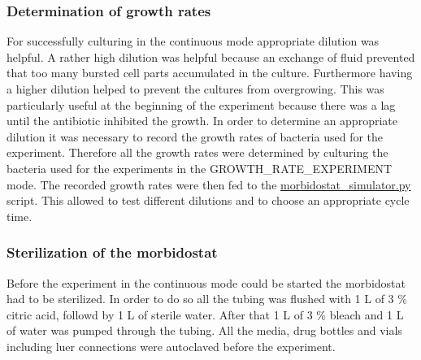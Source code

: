 \subsubsection{Determination of growth rates}
For successfully culturing in the continuous mode appropriate dilution was helpful. A rather high dilution was helpful because an exchange of fluid prevented that too many bursted cell parts accumulated in the culture. Furthermore having a higher dilution helped to prevent the cultures from overgrowing. This was particularly useful at the beginning of the experiment because there was a lag until the antibiotic inhibited the growth. In order to determine an appropriate dilution it was necessary to record the growth rates of bacteria used for the experiment. Therefore all the growth rates were determined by culturing the bacteria used for the experiments in  the GROWTH\_RATE\_EXPERIMENT mode. The recorded growth rates were then fed to the \href{https://github.com/nahanoo/ESBL\_project/}{morbidostat\_simulator.py} script. This allowed to test different dilutions and to choose an appropriate cycle time. 
\label{section:growth_rates} 

\subsubsection{Sterilization of the morbidostat}
Before the experiment in the continuous mode could be started the morbidostat had to be sterilized. In order to do so all the tubing was flushed with 1 L of 3 \% citric acid, followd by 1 L of sterile water. After that 1 L of 3 \% bleach and 1 L of water was pumped through the tubing. All the media, drug bottles and vials including luer connections were autoclaved before the experiment.
\label{section:sterilization}


